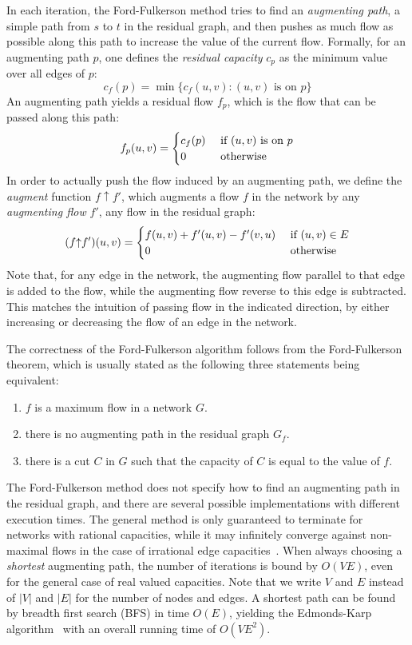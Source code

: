 \documentclass{llncs}
\begin{document}
In each iteration, the Ford-Fulkerson method tries to find an \emph{augmenting path}, \ie a simple path from $s$ to $t$ in the residual graph, and then 
pushes as much flow as possible along this path to increase the value of the current flow. 
Formally, for an augmenting path $p$, one defines the \emph{residual capacity} $c_p$ as the minimum value over all edges of $p$:
\[c_f(p) = \min \{c_f(u, v): \text{$(u, v)$ is on  $p$}\}\]
An augmenting path yields a residual flow $f_p$, which is the flow that can be passed along this path:
\[ f_p (u, v) = 
  \begin{cases}
  c_f(p) \hfill & \text{ if $(u, v)$ is on $p$} \\  
  0 \hfill & \text{ otherwise} \\
  \end{cases} 
\]
\newcommand{\augment}{{\mathbin\uparrow}}
In order to actually push the flow induced by an augmenting path, we define the \emph{augment} function $f\augment f'$, which augments a flow $f$ in the network 
by any \emph{augmenting flow} $f'$, \ie any flow in the residual graph:
\[ (f \augment f') (u, v) = 
  \begin{cases}
  f (u, v) + f'(u, v) - f'(v, u) \hfill & \text{ if $(u, v) \in E$} \\  
  0 \hfill & \text{ otherwise} \\
  \end{cases} 
\]
Note that, for any edge in the network, the augmenting flow parallel to that edge is added to the flow, while the augmenting flow reverse to this edge is subtracted. 
This matches the intuition of passing flow in the indicated direction, by either increasing or decreasing the flow of an edge in the network.

The correctness of the Ford-Fulkerson algorithm follows from the Ford-Fulkerson theorem, which is usually stated as the following three statements being equivalent:
\begin{enumerate}
\item $f$ is a maximum flow in a network $G$.
\item there is no augmenting path in the residual graph $G_f$.
\item there is a cut $C$ in $G$ such that the capacity of $C$ is equal to the value of $f$.
\end{enumerate}

The Ford-Fulkerson method does not specify how to find an augmenting path in the residual graph, and there are several possible implementations with different execution times. The general method is only guaranteed to terminate for networks with rational capacities, while it may infinitely converge against non-maximal flows in the case of irrational edge capacities~\cite{FF56,Zwick95}. When always choosing a \emph{shortest} augmenting path, the number of iterations is bound by $O(VE)$, even for the general case of real valued capacities. Note that we write $V$ and $E$ instead of $|V|$ and $|E|$ for the number of nodes and edges.
A shortest path can be found by breadth first search (BFS) in time $O(E)$, yielding the Edmonds-Karp algorithm~\cite{EK72} with an overall running time of $O(VE^2)$. 
\end{document}
